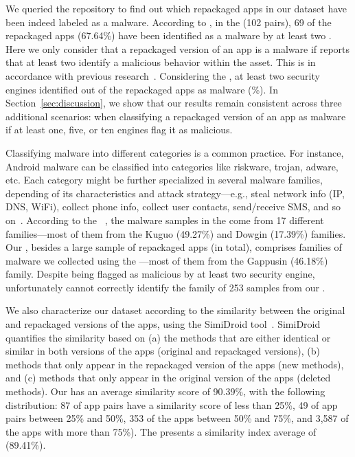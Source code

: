 We queried the \vt repository to find out which repackaged apps in our
dataset have been indeed labeled as a malware.
According to \vt, in the \sds (102 pairs),
69 of the repackaged apps (67.64\%) have been identified as a malware by at least two
\ses. Here we only consider that a repackaged version of an app is a malware if \vt reports that at least
two \ses identify a malicious behavior within the asset. This is in accordance with previous research~\cite{DBLP:conf/uss/ZhuSYQZS020,DBLP:journals/ese/KhanmohammadiEH19}.
Considering the \cds, at least two security engines identified \malwares out of the \apps repackaged apps as malware (\malwaresP\%). In Section~\ref{sec:discussion}, we show that our results remain consistent across three additional scenarios:
when classifying a repackaged version of an app as malware if at least one, five, or ten \vt engines flag it as malicious.

Classifying malware into different categories is a common practice. For instance, Android malware can be classified into categories
like riskware, trojan, adware, etc. Each category might be further specialized in several malware families, depending of its
characteristics and attack strategy---e.g., steal network info (IP, DNS, WiFi), collect phone info,
collect user contacts, send/receive SMS, and so on~\cite{DBLP:conf/iccns/RahaliLKTGM20}.
According to the
\avt~\cite{DBLP:conf/acsac/SebastianC20}, the malware samples in the \sds come from 17 different families---most of them from the Kuguo (49.27\%) and Dowgin (17.39\%) families.  
Our \cds, besides a large sample of repackaged apps (\apps in total),
comprises  families of malware we collected using the \avt---most
of them from the Gappusin (46.18\%) family. Despite being flagged as malicious by at least two security engine, unfortunately \avt cannot correctly identify the family of 253 samples from our \cds.

We also characterize our dataset according to the similarity
between the original and repackaged versions of the apps, using the  
SimiDroid tool~\cite{DBLP:conf/trustcom/0029BK17}. SimiDroid quantifies the similarity
based on (a) the methods that are either identical or similar in both versions of the apps (original and repackaged versions),
(b) methods that only appear in the repackaged version of the apps (new methods), and (c) methods that only appear in the
original version of the apps (deleted methods).
Our \cds has an average similarity score of 90.39\%, with the following distribution: 87 of
app pairs have a similarity score of less than 25\%, 49 of app pairs
between 25\% and 50\%,  353 of the apps between 50\% and 75\%,
and 3,587 of the apps with more than 75\%). The \sds presents a similarity index average of (89.41\%).


